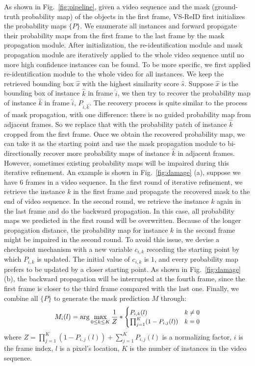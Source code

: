 As shown in Fig.~\ref{fig:pipeline}, given a video sequence and the mask (\ie ground-truth probability map) of the objects in the first frame, VS-ReID first initializes the probability maps $\{P\}$.
%
We enumerate all instances and forward propagate their probability maps from the first frame to the last frame by the mask propagation module.
%
After initialization, the re-identification module and mask propagation module are iteratively applied to the whole video sequence until no more high confidence instances can be found.
%
To be more specific, we first applied re-identification module to the whole video for all instances.
%
We keep the retrieved bounding box $\hat{x}$ with the highest similarity score $\hat{s}$.
%
Suppose $\hat{x}$ is the bounding box of instance $\hat{k}$ in frame $\hat{i}$, we then try to recover the probability map of instance $\hat{k}$ in frame $\hat{i}$, $P_{\hat{i},\hat{k}}$.
%
The recovery process is quite similar to the process of mask propagation, with one difference: there is no guided probability map from adjacent frames. 
%
So we replace that with the probability patch of instance $\hat{k}$ cropped from the first frame.
%
Once we obtain the recovered probability map, we can take it as the starting point and use the mask propagation module to bi-directionally recover more probability maps of instance $\hat{k}$ in adjacent frames.
%
However, sometimes existing probability maps will be impaired during this iterative refinement.
%
An example is shown in Fig.~\ref{fig:damage} (a), suppose we have 6 frames in a video sequence. 
%
In the first round of iterative refinement, we retrieve the instance $k$ in the first frame and propagate the recovered mask to the end of video sequence.
%
In the second round, we retrieve the instance $k$ again in the last frame and do the backward propagation.
%
In this case, all probability maps we predicted in the first round will be overwritten.
%
Because of the longer propagation distance, the probability map for instance $k$ in the second frame might be impaired in the second round.
%
To avoid this issue, we devise a checkpoint mechanism with a new variable $c_{i,k}$ recording the starting point by which $P_{i, k}$ is updated.
% 
The initial value of $c_{i,k}$ is $1$, and every probability map prefers to be updated by a closer starting point.
%
As shown in Fig.~\ref{fig:damage} (b), the backward propagation will be interrupted at the fourth frame, since the first frame is closer to the third frame compared with the last one.
%
Finally, we combine all $\{P\}$ to generate the mask prediction $M$ through:
\[
	\small
	M_i(l) = \arg\underset{0 \le k \le K}{\max}\,\frac{1}{Z} *
	\begin{cases}
	P_{i,k}(l) &\mbox{$k \ne 0$}\\
	\prod_{j=1}^{K} (1-P_{i,j}(l)) &\mbox{$k = 0$}
	\end{cases}
\]
where $Z = \prod_{j=1}^{K} (1-P_{i,j}(l)) + \sum_{j=1}^{K} P_{i,j}(l)$ is a normalizing factor, $i$ is the frame index, $l$ is a pixel's location, $K$ is the number of instances in the video sequence. 

